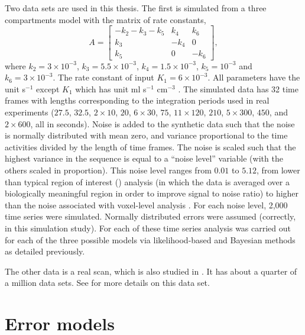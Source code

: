 Two data sets are used in this thesis. The first is simulated from a
three compartments model with the matrix of rate constants,
\begin{equation}
  A = \begin{bmatrix}
    - k_2 - k_3 - k_5 & k_4  & k_6 \\
    k_3               & -k_4 & 0   \\
    k_5               & 0    & -k_6
  \end{bmatrix},
\end{equation}
where $k_2 = 3 \times 10^{-3}$, $k_3 = 5.5 \times 10^{-3}$, $k_4 = 1.5 \times
10^{-3}$, $k_5 = 10^{-3}$ and $k_6 = 3 \times 10^{-3}$. The rate constant of
input $K_1 = 6\times 10^{-3}$. All parameters have the unit s$^{-1}$ except
$K_1$ which has unit ml s$^{-1}$ cm$^{-3}$ \cite{RLNomen}. The simulated data
has 32 time frames with lengths corresponding to the integration periods used
in real experiments ($27.5$, $32.5$, $2 \times 10$, $20$, $6 \times 30$, $75$,
$11 \times 120$, $210$, $5 \times 300$, $450$, and $2 \times 600$, all in
seconds).  Noise is added to the synthetic data such that the noise is
normally distributed with mean zero, and variance proportional to the time
activities divided by the length of time frames. The noise is scaled such that
the highest variance in the sequence is equal to a ``noise level'' variable
(with the others scaled in proportion).  This noise level ranges from $0.01$
to $5.12$, from lower than typical region of interest (\roi) analysis (in
which the data is averaged over a biologically meaningful region in order to
improve signal to noise ratio) to higher than the noise associated with
voxel-level analysis \citep{Peng:2008fx}.  For each noise level, 2,000 time
series were simulated.  Normally distributed errors were assumed (correctly,
in this simulation study). For each of these time series analysis was carried
out for each of the three possible models via likelihood-based and Bayesian
methods as detailed previously.

The other data is a real \pet scan, which is also studied in
\cite{Peng:2008fx}.  It has about a quarter of a million data sets. See
\cite{Zhou2013} for more details on this data set.

\section{Error models}
\label{sec:Error models}

